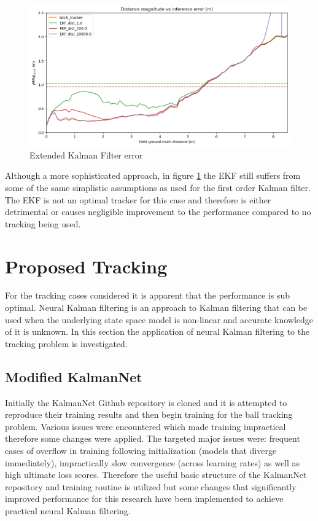 \documentclass[a4paper,twoside,12pt]{report}
\begin{document}
\begin{figure}[h!]
\begin{center}
\includegraphics[width=12cm]{images/ekf_error.png}
\caption{Extended Kalman Filter error}
\label{fig:ekferror}
\end{center}
\end{figure}

Although a more sophisticated approach, in figure \ref{fig:ekferror} the EKF still suffers from some of the same simplistic assumptions as used for the first order Kalman filter. The EKF is not an optimal tracker for this case and therefore is either detrimental or causes negligible improvement to the performance compared to no tracking being used.

\newpage
\section{Proposed Tracking}

For the tracking cases considered it is apparent that the performance is sub optimal. Neural Kalman filtering is an approach to Kalman filtering that can be used when the underlying state space model is non-linear and accurate knowledge of it is unknown. In this section the application of neural Kalman filtering to the tracking problem is investigated.

\subsection{Modified KalmanNet}
\label{section:modifiedknet}

Initially the KalmanNet Github repository \cite{kalmangit} is cloned and it is attempted to reproduce their training results and then begin training for the ball tracking problem. Various issues were encountered which made training impractical therefore some changes were applied. The targeted major issues were: frequent cases of overflow in training following initialization (models that diverge immediately), impractically slow convergence (across learning rates) as well as high ultimate loss scores. Therefore the useful basic structure of the KalmanNet repository and training routine is utilized but some changes that significantly improved performance for this research have been implemented to achieve practical neural Kalman filtering. 
\end{document}
